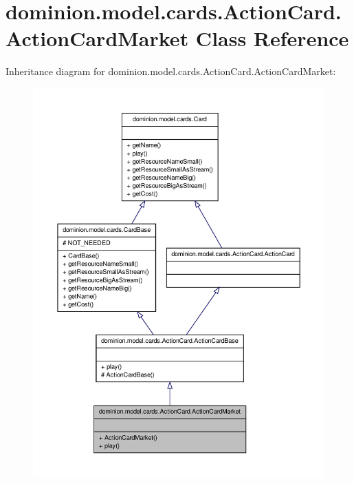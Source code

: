 \hypertarget{classdominion_1_1model_1_1cards_1_1ActionCard_1_1ActionCardMarket}{\section{dominion.\-model.\-cards.\-Action\-Card.\-Action\-Card\-Market \-Class \-Reference}
\label{classdominion_1_1model_1_1cards_1_1ActionCard_1_1ActionCardMarket}
}


\-Inheritance diagram for dominion.\-model.\-cards.\-Action\-Card.\-Action\-Card\-Market\-:
\nopagebreak
\begin{figure}[H]
\begin{center}
\leavevmode
\includegraphics[width=350pt]{classdominion_1_1model_1_1cards_1_1ActionCard_1_1ActionCardMarket__inherit__graph}
\end{center}
\end{figure}


